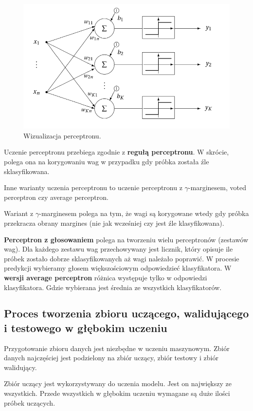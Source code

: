 \documentclass[wi]{zut}
\begin{document}
\begin{figure}[H]
    \centering
    \includegraphics[width=0.5\linewidth]{images/perceptron.png}
    \caption{Wizualizacja perceptronu.}
    \label{fig:apriori}
\end{figure}

Uczenie perceptronu przebiega zgodnie z \textbf{regułą perceptronu}. W skrócie, polega ona na korygowaniu wag w przypadku gdy próbka została źle sklasyfikowana. 

Inne warianty uczenia perceptronu to uczenie perceptronu z $\gamma$-marginesem, voted perceptron czy average perceptron.

Wariant z $\gamma$-marginesem polega na tym, że wagi są korygowane wtedy gdy próbka przekracza obrany margines (nie jak wcześniej czy jest źle klasyfikowana).

\textbf{Perceptron z głosowaniem} polega na tworzeniu wielu perceptronów (zestawów wag). Dla każdego zestawu wag przechowywany jest licznik, który opisuje ile próbek zostało dobrze sklasyfikowanych aż wagi należało poprawić. W procesie predykcji wybieramy głosem większościowym odpowiedzieć klasyfikatora. W \textbf{wersji average perceptron} różnica występuje tylko w odpowiedzi klasyfikatora. Gdzie wybierana jest średnia ze wszystkich klasyfikatorów.
\question

\subsection{Proces tworzenia zbioru uczącego, walidującego i testowego w głębokim uczeniu}

Przygotowanie zbioru danych jest niezbędne w uczeniu maszynowym. Zbiór danych najczęściej jest podzielony na zbiór uczący, zbiór testowy i zbiór walidujący. 

Zbiór uczący jest wykorzystywany do uczenia modelu. Jest on największy ze wszystkich. Przede wszystkich w głębokim uczeniu wymagane są duże ilości próbek uczących.
\end{document}
